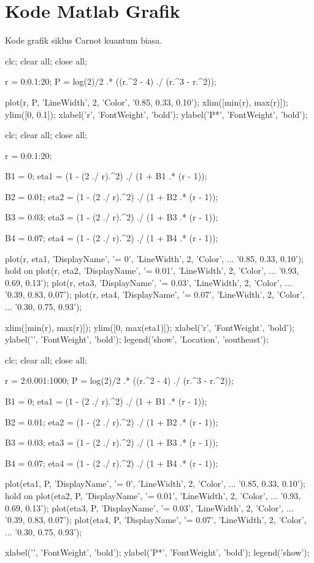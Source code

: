 \chapter{Kode Matlab Grafik}

Kode grafik siklus Carnot kuantum biasa.
\begin{verbatim*}
clc; clear all; close all;

r = 0:0.1:20;
P = log(2)/2 .* ((r.^2 - 4) ./ (r.^3 - r.^2));

plot(r, P, 'LineWidth', 2, 'Color', '0.85, 0.33, 0.10');
xlim([min(r), max(r)]);
ylim([0, 0.1]);
xlabel('r', 'FontWeight', 'bold');
ylabel('P*', 'FontWeight', 'bold');

clc; clear all; close all;

r = 0:0.1:20;

B1 = 0;
eta1 = (1 - (2 ./ r).^2) ./ (1 + B1 .* (r - 1));

B2 = 0.01;
eta2 = (1 - (2 ./ r).^2) ./ (1 + B2 .* (r - 1));

B3 = 0.03;
eta3 = (1 - (2 ./ r).^2) ./ (1 + B3 .* (r - 1));

B4 = 0.07;
eta4 = (1 - (2 ./ r).^2) ./ (1 + B4 .* (r - 1));

plot(r, eta1, 'DisplayName', '\beta = 0', 'LineWidth', 2, 'Color', ...
'0.85, 0.33, 0.10');
hold on
plot(r, eta2, 'DisplayName', '\beta = 0.01', 'LineWidth', 2, 'Color', ...
'0.93, 0.69, 0.13');
plot(r, eta3, 'DisplayName', '\beta = 0.03', 'LineWidth', 2, 'Color', ...
'0.39, 0.83, 0.07');
plot(r, eta4, 'DisplayName', '\beta = 0.07', 'LineWidth', 2, 'Color', ...
'0.30, 0.75, 0.93');

xlim([min(r), max(r)]);
ylim([0, max(eta1)]);
xlabel('r', 'FontWeight', 'bold');
ylabel('\eta', 'FontWeight', 'bold');
legend('show', 'Location', 'southeast');

clc; clear all; close all;

r = 2:0.001:1000;
P = log(2)/2 .* ((r.^2 - 4) ./ (r.^3 - r.^2));

B1 = 0;
eta1 = (1 - (2 ./ r).^2) ./ (1 + B1 .* (r - 1));

B2 = 0.01;
eta2 = (1 - (2 ./ r).^2) ./ (1 + B2 .* (r - 1));

B3 = 0.03;
eta3 = (1 - (2 ./ r).^2) ./ (1 + B3 .* (r - 1));

B4 = 0.07;
eta4 = (1 - (2 ./ r).^2) ./ (1 + B4 .* (r - 1));

plot(eta1, P, 'DisplayName', '\beta = 0', 'LineWidth', 2, 'Color', ...
'0.85, 0.33, 0.10');
hold on
plot(eta2, P, 'DisplayName', '\beta = 0.01', 'LineWidth', 2, 'Color', ...
'0.93, 0.69, 0.13');
plot(eta3, P, 'DisplayName', '\beta = 0.03', 'LineWidth', 2, 'Color', ...
'0.39, 0.83, 0.07');
plot(eta4, P, 'DisplayName', '\beta = 0.07', 'LineWidth', 2, 'Color', ...
'0.30, 0.75, 0.93');

xlabel('\eta', 'FontWeight', 'bold');
ylabel('P*', 'FontWeight', 'bold');
legend('show');
\end{verbatim*}

